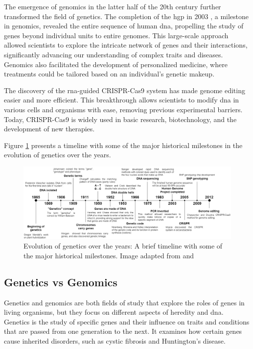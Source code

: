 The emergence of genomics in the latter half of the 20th century further transformed the field of genetics. The completion of the \ac{hgp} in 2003 \cite{Collins1995}, a milestone in genomics, revealed the entire sequence of human \ac{dna}, propelling the study of genes beyond individual units to entire genomes. This large-scale approach allowed scientists to explore the intricate network of genes and their interactions, significantly advancing our understanding of complex traits and diseases. Genomics also facilitated the development of personalized medicine, where treatments could be tailored based on an individual's genetic makeup. \cite{Gayon2016}

The discovery of the \ac{rna}-guided CRISPR-Cas9 system has made genome editing easier and more efficient. This breakthrough allows scientists to modify \ac{dna} in various cells and organisms with ease, removing previous experimental barriers. Today, CRISPR-Cas9 is widely used in basic research, biotechnology, and the development of new therapies. \cite{CRISPR-CAS9}

Figure \ref{fig:timeline} presents a timeline with some of the major historical milestones in the evolution of genetics over the years.

\begin{figure}[H]
    \centering
    \includegraphics[width=1\textwidth]{figs/timeline.png}
    \caption{Evolution of genetics over the years: A brief timeline with some of the major historical milestones. Image adapted from \cite{genetictimeline} and \cite{genetictimeline2}}
    \label{fig:timeline}
\end{figure}

\subsection{Genetics vs Genomics} \label{subsec:genetics_genomics}

Genetics and genomics are both fields of study that explore the roles of genes in living organisms, but they focus on different aspects of heredity and \ac{dna}. Genetics is the study of specific genes and their influence on traits and conditions that are passed from one generation to the next. It examines how certain genes cause inherited disorders, such as cystic fibrosis and Huntington's disease. \cite{NHGRI2018}

